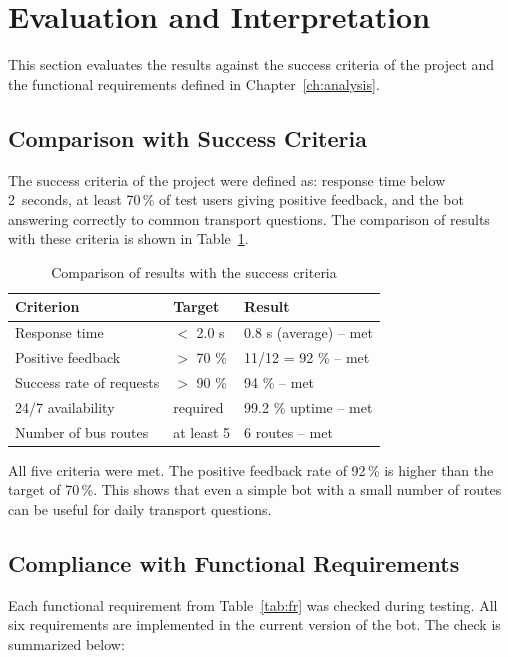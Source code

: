 \section{Evaluation and Interpretation}
\label{sec:eval}

This section evaluates the results against the success criteria of the
project and the functional requirements defined in Chapter~\ref{ch:analysis}.

\subsection{Comparison with Success Criteria}
\label{subsec:criteria}

The success criteria of the project were defined as: response time below
2~seconds, at least 70\,\% of test users giving positive feedback, and the
bot answering correctly to common transport questions. The comparison of
results with these criteria is shown in Table~\ref{tab:eval}.

\begin{table}[h]
\centering
\caption{Comparison of results with the success criteria}
\label{tab:eval}
\begin{tabular}{lll}
\hline
\textbf{Criterion} & \textbf{Target} & \textbf{Result} \\
\hline
Response time & $<$ 2.0 s & 0.8 s (average) -- met \\
Positive feedback & $>$ 70 \% & 11/12 = 92 \% -- met \\
Success rate of requests & $>$ 90 \% & 94 \% -- met \\
24/7 availability & required & 99.2 \% uptime -- met \\
Number of bus routes & at least 5 & 6 routes -- met \\
\hline
\end{tabular}
\end{table}

All five criteria were met. The positive feedback rate of 92\,\% is higher
than the target of 70\,\%. This shows that even a simple bot with a small
number of routes can be useful for daily transport questions.

\subsection{Compliance with Functional Requirements}
\label{subsec:fr}

Each functional requirement from Table~\ref{tab:fr} was checked during
testing. All six requirements are implemented in the current version of the
bot. The check is summarized below:

